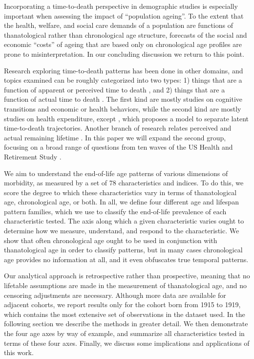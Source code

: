 \documentclass[11pt,oneside]{article} %
\begin{document}
Incorporating a time-to-death perspective in demographic studies is especially
important when assessing the impact of ``population ageing''.
To the extent that the health, welfare, and social care demands of a
population are functions of thanatological rather than chronological age
structure, forecasts of the social and economic ``costs'' of ageing that are
based only on chronological age profiles are prone to misinterpretation.
In our concluding discussion we return to this point.

Research exploring time-to-death patterns has been done in other
domains, and topics examined can be roughly categorized into two types: 1) things that are a
function of apparent or perceived time to death
\citep{hamermesh1985expectations,hurd1995evaluation,carstensen2006influence,gan2004subjective,biro2010subjective,salm2010subjective,van2010living,cocco2012longevity,payne2013life,balia2013survival},
and 2) things that are a function of actual time to death
\citep{miller2001increasing,seshamani2004longitudinal,werblow2007population,
wolf2015disability}.
The first kind are mostly studies on cognitive transitions and economic or
health behaviors, while the second kind are mostly studies on health
expenditure, except \citet{wolf2015disability}, which proposes a model to
separate latent time-to-death trajectories.
Another branch of research relates perceived and actual remaining lifetime
\citep{perozek2008using,delavande2011differential,post2012longevity,kutlu2013individuals}.
In this paper we will expand the second group, focusing on a broad range of
questions from ten waves of the US Health and Retirement Study \citep{HRS}.

We aim to understand the end-of-life age patterns of various dimensions of
morbidity, as measured by a set of 78 characteristics and indices. To do this,
we score the degree to which these characteristics vary in terms of thanatological
age, chronological age, or both. In all, we define four different age and
lifespan pattern families, which we use to classify the end-of-life prevalence
of each characteristic tested. The axis along which a given characteristic varies ought
to determine how we measure, understand, and respond to the characteristic. We show that often chronological age ought to be used in conjunction with
thanatological age in order to classify patterns, but in many cases
chronological age provides no information at all, and it even obfuscates true temporal
patterns.

Our analytical approach is retrospective rather than
prospective, meaning that no lifetable assumptions are made in the measurement
of thanatological age, and no censoring adjustments are necessary. Although more
data are available for adjacent cohorts, we report results only for the cohort
born from 1915 to 1919, which contains the most extensive set of observations in
the dataset used. In the following section we describe the methods in
greater detail. We then demonstrate the four age axes by way of example,
and summarize all characteristics tested in terms of these four axes. Finally,
we discuss some implications and applications of this work.
\end{document}
